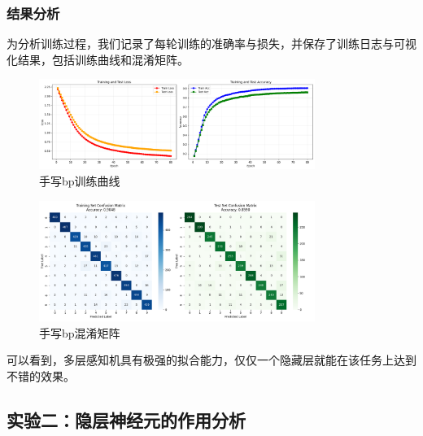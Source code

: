 \documentclass[12pt,a4paper]{article}
\begin{document}
\subsubsection{结果分析}
为分析训练过程，我们记录了每轮训练的准确率与损失，并保存了训练日志与可视化结果，包括训练曲线和混淆矩阵。
\begin{figure}[H]
    \centering
    \includegraphics[width=0.8\textwidth]{../images/bpb.png}
    \caption{手写bp训练曲线}
    \label{fig:bp1}
\end{figure}
\begin{figure}[H]
    \centering
    \includegraphics[width=0.8\textwidth]{../images/bpa.png}
    \caption{手写bp混淆矩阵}
    \label{fig:bp2}
\end{figure}
可以看到，多层感知机具有极强的拟合能力，仅仅一个隐藏层就能在该任务上达到不错的效果。
\subsection{实验二：隐层神经元的作用分析}
\end{document}
